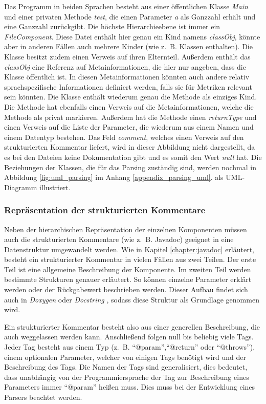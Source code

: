 Das Programm in beiden Sprachen besteht aus einer öffentlichen Klasse \textit{Main} und einer privaten Methode \textit{test}, die einen Parameter \textit{a} als Ganzzahl erhält und eine Ganzzahl zurückgibt. Die höchste Hierarchieebene ist immer ein \textit{FileComponent}. Diese Datei enthält hier genau ein Kind namens \textit{classObj}, könnte aber in anderen Fällen auch mehrere Kinder (wie z.~B. Klassen enthalten). Die Klasse besitzt zudem einen Verweis auf ihren Elternteil. Außerdem enthält das \textit{classObj} eine Referenz auf Metainformationen, die hier nur angeben, dass die Klasse öffentlich ist. In diesen Metainformationen könnten auch andere relativ sprachspezifische Informationen definiert werden, falls sie für Metriken relevant sein könnten. Die Klasse enthält wiederum genau die Methode als einziges Kind. Die Methode hat ebenfalls einen Verweis auf die Metainformationen, welche die Methode als privat markieren. Außerdem hat die Methode einen \textit{returnType} und einen Verweis auf die Liste der Parameter, die wiederum aus einem Namen und einem Datentyp bestehen. Das Feld \textit{comment}, welches einen Verweis auf den strukturierten Kommentar liefert, wird in dieser Abbildung nicht dargestellt, da es bei den Dateien keine Dokumentation gibt und es somit den Wert \textit{null} hat. Die Beziehungen der Klassen, die für das Parsing zuständig sind, werden nochmal in Abbildung \ref{fig:uml_parsing} im Anhang \ref{appendix_parsing_uml}. als UML-Diagramm illustriert.

\subsubsection{Repräsentation der strukturierten Kommentare}\label{chapter:structured_comments}
Neben der hierarchischen Repräsentation der einzelnen Komponenten müssen auch die strukturierten Kommentare (wie z.~B. Javadoc) geeignet in eine Datenstruktur umgewandelt werden. Wie in Kapitel \ref{chapter:javadoc}
 erläutert, besteht ein strukturierter Kommentar in vielen Fällen aus zwei Teilen. Der erste Teil ist eine allgemeine Beschreibung der Komponente. Im zweiten Teil werden bestimmte Strukturen genauer erläutert. So können einzelne Parameter erklärt werden oder der Rückgabewert beschrieben werden. 
 Dieser Aufbau findet sich auch in \textit{Doxygen} \cite{doxygen} oder \textit{Docstring} \cite{docstring}, sodass diese Struktur als Grundlage genommen wird. 
 
 Ein strukturierter Kommentar besteht also aus einer generellen Beschreibung, die auch weggelassen werden kann. Anschließend folgen null bis beliebig viele Tags. Jeder Tag besteht aus einem Typ (z.~B. \enquote{@param},\enquote{@return} oder \enquote{@throws}), einem optionalen Parameter, welcher von einigen Tags benötigt wird und der Beschreibung des Tags. Die Namen der Tags sind generalisiert, dies bedeutet, dass unabhängig von der Programmiersprache der Tag zur Beschreibung eines Parameters immer \enquote{@param} heißen muss. Dies muss bei der Entwicklung eines Parsers beachtet werden. 
 
